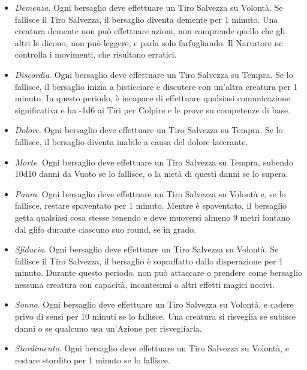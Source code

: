 \begin{multicols}{2}
\begin{itemize}[leftmargin=*] \setlength{\itemsep}{0pt}
	\item \emph{Demenza}. Ogni bersaglio deve effettuare un Tiro Salvezza su Volontà. Se fallisce il Tiro Salvezza, il bersaglio diventa demente per 1 minuto. Una creatura demente non può effettuare azioni, non comprende quello che gli altri le dicono, non può leggere, e parla solo farfugliando. Il Narratore ne controlla i movimenti, che risultano erratici.
	\item \emph{Discordia}. Ogni bersaglio deve effettuare un Tiro Salvezza su Tempra. Se lo fallisce, il bersaglio inizia a bisticciare e discutere con un'altra creatura per 1 minuto. In questo periodo, è incapace di effettuare qualsiasi comunicazione significativa e ha -1d6 ai Tiri per Colpire e le prove su competenze di base.
	\item \emph{Dolore}. Ogni bersaglio deve effettuare un Tiro Salvezza su Tempra. Se lo fallisce, il bersaglio diventa inabile a causa del dolore lacerante.
	\item \emph{Morte}. Ogni bersaglio deve effettuare un Tiro Salvezza su Tempra, subendo 10d10 danni da Vuoto se lo fallisce, o la metà di questi danni se lo supera.
	\item \emph{Paura}. Ogni bersaglio deve effettuare un Tiro Salvezza su Volontà e, se lo fallisce, restare spaventato per 1 minuto. Mentre è spaventato, il bersaglio getta qualsiasi cosa stesse tenendo e deve muoversi almeno 9 metri lontano dal glifo durante ciascuno suo round, se in grado.
	\item \emph{Sfiducia}. Ogni bersaglio deve effettuare un Tiro Salvezza su Volontà. Se fallisce il Tiro Salvezza, il bersaglio è sopraffatto dalla disperazione per 1 minuto. Durante questo periodo, non può attaccare o prendere come bersaglio nessuna creatura con capacità, incantesimi o altri effetti magici nocivi.
	\item \emph{Sonno}. Ogni bersaglio deve effettuare un Tiro Salvezza su Volontà, e cadere privo di sensi per 10 minuti se lo fallisce. Una creatura si risveglia se subisce danni o se qualcuno usa un'Azione per risvegliarla.
	\item \emph{Stordimento}. Ogni bersaglio deve effettuare un Tiro Salvezza su Volontà, e restare stordito per 1 minuto se lo fallisce.
\end{itemize}


\end{multicols}
